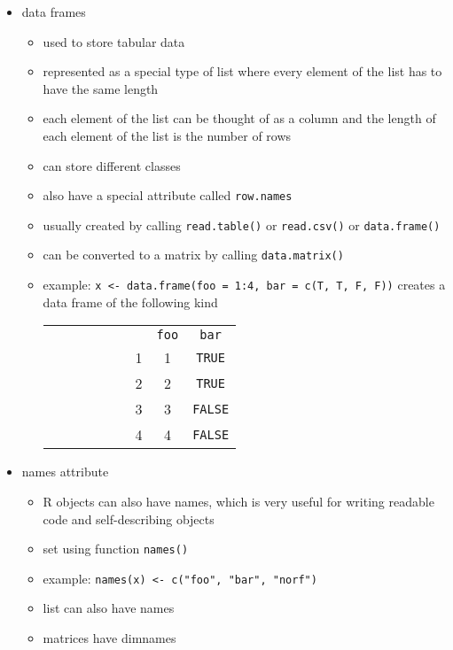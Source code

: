 \documentclass[11pt,fancy]{elegantbook}
\begin{document}
\begin{itemize}
\begin{itemize}
          \end{itemize}
    \item data frames
          \begin{itemize}
              \item used to store tabular data
              \item represented as a special type of list where every element of the list has to have the same length
              \item each element of the list can be thought of as a column and the length of each element of the list is the number of rows
              \item can store different classes
              \item also have a special attribute called \texttt{row.names}
              \item usually created by calling \texttt{read.table()} or \texttt{read.csv()} or \texttt{data.frame()}
              \item can be converted to a matrix by calling \texttt{data.matrix()}
              \item example: \texttt{x <- data.frame(foo = 1:4, bar = c(T, T, F, F))} creates a data frame of the following kind
                    \begin{table}[H]
                        \begin{tabular}{c c c c c c c c c}
                             &  &  &  &  &  &   & \texttt{foo} & \texttt{bar}   \\
                             &  &  &  &  &  & 1 & 1            & \texttt{TRUE}  \\
                             &  &  &  &  &  & 2 & 2            & \texttt{TRUE}  \\
                             &  &  &  &  &  & 3 & 3            & \texttt{FALSE} \\
                             &  &  &  &  &  & 4 & 4            & \texttt{FALSE}
                        \end{tabular}
                    \end{table}
          \end{itemize}
    \item names attribute
          \begin{itemize}
              \item R objects can also have names, which is very useful for writing readable code and self-describing objects
              \item set using function \texttt{names()}
              \item example: \texttt{names(x) <- c("foo", "bar", "norf")}
              \item list can also have names
              \item matrices have dimnames
          \end{itemize}
\end{itemize}
\end{document}
